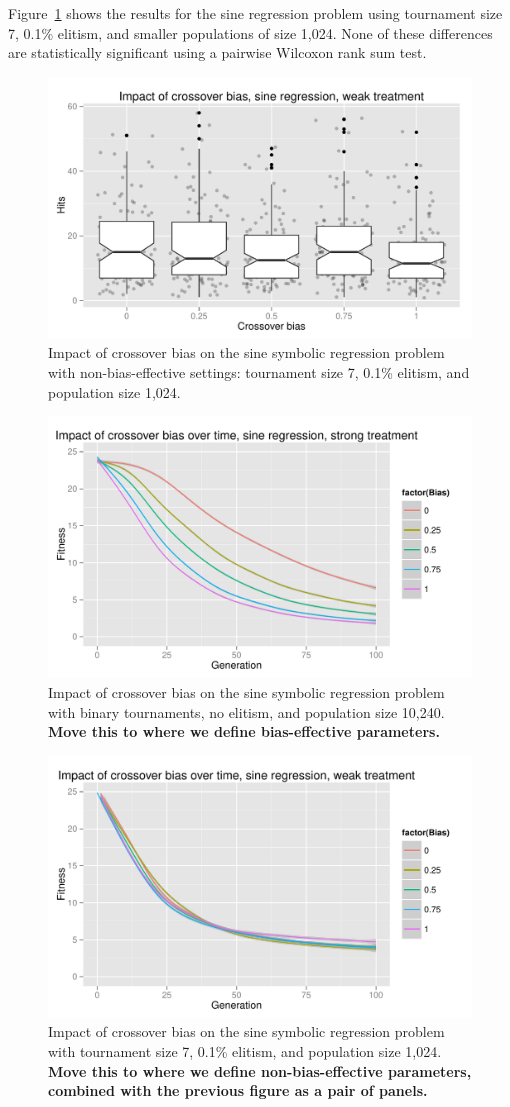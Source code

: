 \documentclass{sig-alternate}
\begin{document}
Figure~\ref{fig:sineBiasResultsWeak} shows the results for the sine regression problem using tournament size 7, 0.1\%
elitism, and smaller populations  of size 1,024. None of these differences are statistically significant using a
pairwise Wilcoxon rank sum test.

\begin{figure}
\centering
\includegraphics[width=0.45 \textwidth]{Plots/Sine_XO_impact_weak_boxplot.pdf}
\caption{Impact of crossover bias on the sine symbolic regression problem with non-bias-effective settings: tournament
size 7, 0.1\% elitism, and population size 1,024.}
\label{fig:sineBiasResultsWeak}
\end{figure}

\begin{figure}
\centering
\includegraphics[width=0.45 \textwidth]{Plots/Sine_XO_fitness_vs_gen_strong.pdf}
\caption{Impact of crossover bias on the sine symbolic regression problem with binary tournaments, no elitism, and 
population size 10,240. \textbf{Move this to where we define bias-effective parameters.}}
\label{fig:sineBiasFitnessVsGenStrong}
\end{figure}

\begin{figure}
\centering
\includegraphics[width=0.45 \textwidth]{Plots/Sine_XO_fitness_vs_gen_weak.pdf}
\caption{Impact of crossover bias on the sine symbolic regression problem with tournament size 7, 0.1\% elitism, and 
population size 1,024.  \textbf{Move this to where we define non-bias-effective parameters, combined with the previous figure as a pair of panels.}}
\label{fig:sineBiasFitnessVsGenWeak}
\end{figure}
\end{document}
